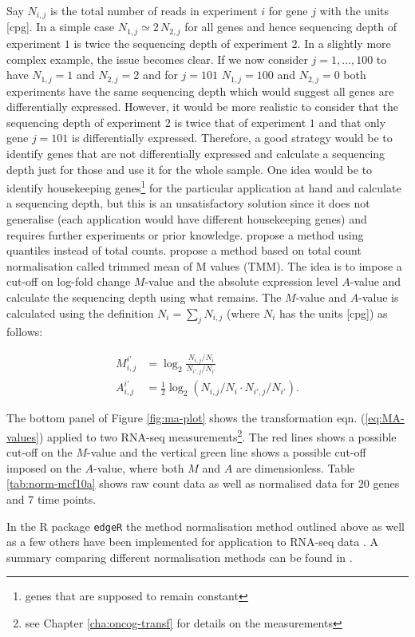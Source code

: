 Say $N_{i,j}$ is the total number of reads in experiment $i$ for gene $j$ with the units [cpg]. In a simple case $N_{1,j} \simeq 2 \, N_{2,j}$ for all genes and hence sequencing depth of experiment $1$ is twice the sequencing depth of experiment $2$. In a slightly more complex example, the issue becomes clear. If we now consider $j = 1, \ldots,  100$ to have $N_{1,j} = 1$ and $N_{2,j} = 2$ and for $j = 101$ $N_{1,j} = 100$ and $N_{2,j} = 0$ both experiments have the same sequencing depth which would suggest all genes are differentially expressed. However, it would be more realistic to consider that the sequencing depth of experiment $2$ is twice that of experiment $1$ and that only gene $j = 101$ is differentially expressed. Therefore, a good strategy would be to identify genes that are not differentially expressed and calculate a sequencing depth just for those and use it for the whole sample. One idea would be to identify housekeeping genes\footnote{genes that are supposed to remain constant} for the particular application at hand and calculate a sequencing depth, but this is an unsatisfactory solution since it does not generalise (each application would have different housekeeping genes) and requires further experiments or prior knowledge. \cite{Bullard:2010go} propose a method using quantiles instead of total counts. \cite{Robinson:2010dd} propose a method based on total count normalisation called trimmed mean of M values (TMM). The idea is to impose a cut-off on log-fold change $M$-value and the absolute expression level $A$-value and calculate the sequencing depth using what remains. The $M$-value  and $A$-value is calculated using the definition $N_i = \sum_j N_{i,j} $ (where $N_i$ has the units [cpg]) as follows:

\begin{equation}
  \label{eq:MA-values}
  \begin{split}
  M_{i,j}^{i'} &= \log_2 \frac{N_{i,j} / N_i}{N_{i',j}/ N_{i'}} \\
  A_{i,j}^{i'} &= \frac{1}{2} \log_2 \left(N_{i,j}/ N_i \cdot N_{i',j} / N_{i'} \right).
  \end{split}
\end{equation}

The bottom panel of Figure \ref{fig:ma-plot} shows the transformation eqn. (\ref{eq:MA-values}) applied to two RNA-seq measurements\footnote{see Chapter \ref{cha:oncog-transf} for details on the measurements}. The red lines shows a possible cut-off on the $M$-value and the vertical green line shows a possible cut-off imposed on the $A$-value, where both $M$ and $A$ are dimensionless. Table \ref{tab:norm-mcf10a} shows raw count data as well as normalised data for $20$ genes and $7$ time points.

In the R package \texttt{edgeR} the method normalisation method outlined above as well as a few others have been implemented for application to RNA-seq data \citep{Robinson:2010cw}.
A summary comparing different normalisation methods can be found in \cite{Oshlack:2010kr}.



